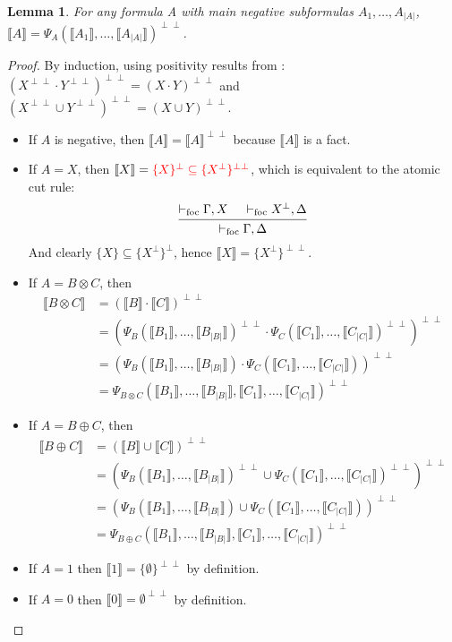 \documentclass{article}
\newcommand\size[1]{{\lvert #1 \rvert}}
\newcommand\sem[1]{{\llbracket #1 \rrbracket}}
\newcommand\biperp{{\perp\perp}}
\newcommand\vdashfoc{\vdash_\text{foc}}
\newtheorem{lemma}[theorem]{Lemma}
\begin{document}
\begin{lemma}
    \label{positivity}
    For any formula A with main negative subformulas $A_1, \dots, A_\size{A}$, $\sem{A} = \Psi_A(\sem{A_1}, \dots, \sem{A_\size{A}})^\biperp$.
\end{lemma}
\begin{proof}
    By induction, using positivity results from \cite[appendix F]{girard}: $(X^\biperp \cdot Y^\biperp)^\biperp = (X \cdot Y)^\biperp$ and $(X^\biperp \cup Y^\biperp)^\biperp = (X \cup Y)^\biperp$.
    \begin{itemize}
        \item If $A$ is negative, then $\sem{A} = \sem{A}^\biperp$ because $\sem{A}$ is a fact.
        \item If $A = X$, then $\sem{X} = \color{red}\{X\}^\perp \subseteq \{X^\perp\}^\biperp${\color{red}, which is equivalent to the atomic cut rule: $$\begin{prooftree}
            \hypo{\vdashfoc \Gamma, X}
            \hypo{\vdashfoc X^\perp, \Delta}
            \infer2{\vdashfoc \Gamma, \Delta}
        \end{prooftree}$$}
        {And clearly $\{X\} \subseteq \{X^\perp\}^\perp$, \color{red}hence $\sem{X} = \{X^\perp\}^\biperp$.}
        \item If $A = B \otimes C$, then \begin{align*}
            \sem{B \otimes C} &= (\sem{B} \cdot \sem{C})^\biperp \\
            &= (\Psi_B(\sem{B_1}, \dots, \sem{B_\size{B}})^\biperp \cdot \Psi_C(\sem{C_1}, \dots, \sem{C_\size{C}})^\biperp)^\biperp \\
            &= (\Psi_B(\sem{B_1}, \dots, \sem{B_\size{B}}) \cdot \Psi_C(\sem{C_1}, \dots, \sem{C_\size{C}}))^\biperp \\
            &= \Psi_{B \otimes C}(\sem{B_1}, \dots, \sem{B_\size{B}}, \sem{C_1}, \dots, \sem{C_\size{C}})^\biperp
        \end{align*}
        \item If $A = B \oplus C$, then \begin{align*}
            \sem{B \oplus C} &= (\sem{B} \cup \sem{C})^\biperp \\
            &= (\Psi_B(\sem{B_1}, \dots, \sem{B_\size{B}})^\biperp \cup \Psi_C(\sem{C_1}, \dots, \sem{C_\size{C}})^\biperp)^\biperp \\
            &= (\Psi_B(\sem{B_1}, \dots, \sem{B_\size{B}}) \cup \Psi_C(\sem{C_1}, \dots, \sem{C_\size{C}}))^\biperp \\
            &= \Psi_{B \oplus C}(\sem{B_1}, \dots, \sem{B_\size{B}}, \sem{C_1}, \dots, \sem{C_\size{C}})^\biperp
        \end{align*}
        \item If $A = 1$ then $\sem{1} = \{\emptyset\}^\biperp$ by definition.
        \item If $A = 0$ then $\sem{0} = \emptyset^\biperp$ by definition.
    \end{itemize}
\end{proof}
\end{document}
